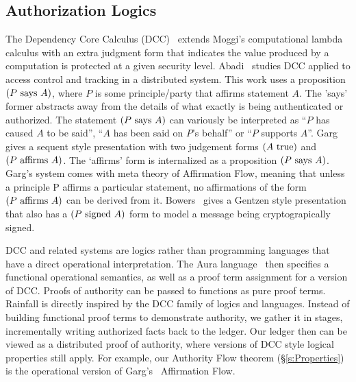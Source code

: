 \subsection{Authorization Logics}
The Dependency Core Calculus (DCC)~\cite{Abadi1999:DCC} extends Moggi's computational lambda calculus with an extra judgment form that indicates the value produced by a computation is protected at a given security level. Abadi~\cite{Abadi2007:AccessControl} studies DCC applied to access control and tracking in a distributed system. This work uses a proposition $(P~\textrm{says}~A)$, where $P$ is some principle/party that affirms statement $A$. The 'says' former abstracts away from the details of what exactly is being authenticated or authorized. The statement $(P~\textrm{says}~A)$ can variously be interpreted as ``$P$ has caused $A$ to be said'', ``$A$ has been said on $P$'s behalf'' or ``$P$ supports $A$''. Garg~\cite{Garg2006:Constructive} gives a sequent style presentation with two judgement forms $(A~\textrm{true})$ and $(P~\textrm{affirms}~A)$. The `affirms' form is internalized as a proposition $(P~\textrm{says}~A)$. Garg's system comes with meta theory of Affirmation Flow, meaning that unless a principle P affirms a particular statement, no affirmations of the form $(P~\textrm{affirms}~A)$ can be derived from it. Bowers~\cite{Bowers2007:Consumable} gives a Gentzen style presentation that also has a $(P~\textrm{signed}~A)$ form to model a message being cryptograpically signed.

DCC and related systems are logics rather than programming languages that have a direct operational interpretation. The Aura language~\cite{Jia2008:Aura} then specifies a functional operational semantics, as well as a proof term assignment for a version of DCC. Proofs of authority can be passed to functions as pure proof terms. Rainfall is directly inspired by the DCC family of logics and languages. Instead of building functional proof terms to demonstrate authority, we gather it in stages, incrementally writing authorized facts back to the ledger. Our ledger then can be viewed as a distributed proof of authority, where versions of DCC style logical properties still apply. For example, our Authority Flow theorem (\S\ref{s:Properties}) is the operational version of Garg's~\cite{Garg2006:Constructive} Affirmation Flow.




